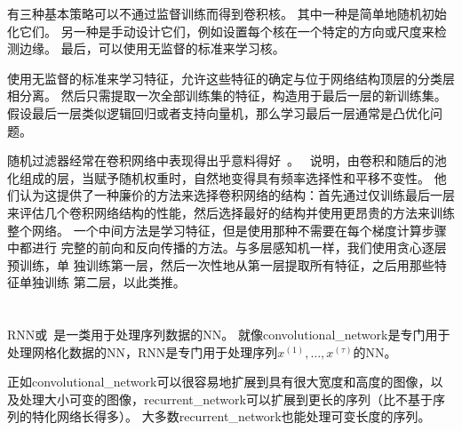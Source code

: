 有三种基本策略可以不通过监督训练而得到卷积核。
其中一种是简单地随机初始化它们。
另一种是手动设计它们，例如设置每个核在一个特定的方向或尺度来检测边缘。
最后，可以使用无监督的标准来学习核。\par

使用无监督的标准来学习特征，允许这些特征的确定与位于网络结构顶层的分类层相分离。
然后只需提取一次全部训练集的特征，构造用于最后一层的新训练集。
假设最后一层类似逻辑回归或者支持向量机，那么学习最后一层通常是凸优化问题。\par


随机过滤器经常在卷积网络中表现得出乎意料得好~\cite{Jarrett-ICCV2009-small,Saxe-ICML2011,pinto2011scaling,cox2011beyond}。
\cite{Saxe-ICML2011}~说明，由卷积和随后的池化组成的层，当赋予随机权重时，自然地变得具有频率选择性和平移不变性。
他们认为这提供了一种廉价的方法来选择卷积网络的结构：首先通过仅训练最后一层来评估几个卷积网络结构的性能，然后选择最好的结构并使用更昂贵的方法来训练整个网络。
一个中间方法是学习特征，但是使用那种不需要在每个梯度计算步骤中都进行
完整的前向和反向传播的方法。与多层感知机一样，我们使用贪心逐层预训练，单
独训练第一层，然后一次性地从第一层提取所有特征，之后用那些特征单独训练
第二层，以此类推。

\section{}
\label{sec:lstm}
\label{chap:sequence_modeling_recurrent_and_recursive_nets}
\gls{RNN}或~是一类用于处理序列数据的\gls{NN}。
就像\gls{convolutional_network}是专门用于处理网格化数据的\gls{NN}，\gls{RNN}是专门用于处理序列$x^{(1)}, \dots, x^{(\tau)}$的\gls{NN}。

正如\gls{convolutional_network}可以很容易地扩展到具有很大宽度和高度的图像，以及处理大小可变的图像，\gls{recurrent_network}可以扩展到更长的序列（比不基于序列的特化网络长得多）。
大多数\gls{recurrent_network}也能处理可变长度的序列。

